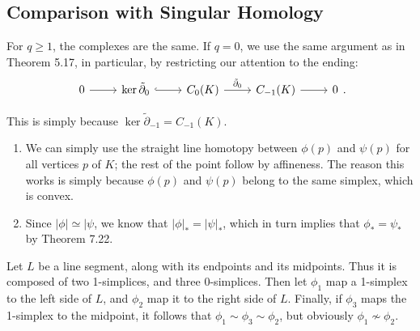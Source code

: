 \documentclass[../../solutions.tex]{subfiles}
\begin{document}
\subsection{Comparison with Singular Homology}
\begin{exercise} \leavevmode
For $q\ge1$, the complexes are the same.
If $q=0$, we use the same argument as in Theorem 5.17, in particular, by restricting our attention to the ending:
\[
\begin{tikzcd}
0\ar[r] & \ker\tilde\partial_0\ar[r,hookrightarrow] & C_0(K)\ar[r,"\tilde\partial_0"] & C_{-1}(K)\ar[r] & 0
\end{tikzcd}.
\]
\end{exercise}

\begin{exercise} \leavevmode
This is simply because $\ker\tilde\partial_{-1}=C_{-1}(K)$.
\end{exercise}

\begin{exercise} \leavevmode
\begin{enumerate}
\item
We can simply use the straight line homotopy between $\phi(p)$ and $\psi(p)$ for all vertices $p$ of $K$;
the rest of the point follow by affineness.
The reason this works is simply because $\phi(p)$ and $\psi(p)$ belong to the same simplex, which is convex.
\item
Since $|\phi|\simeq|\psi$, we know that $|\phi|_*=|\psi|_*$, which in turn implies that $\phi_*=\psi_*$ by Theorem 7.22.
\end{enumerate}
\end{exercise}

\begin{exercise} \leavevmode
Let $L$ be a line segment, along with its endpoints and its midpoints.
Thus it is composed of two 1-simplices, and three 0-simplices.
Then let $\phi_1$ map a 1-simplex to the left side of $L$, and $\phi_2$ map it to the right side of $L$.
Finally, if $\phi_3$ maps the 1-simplex to the midpoint, it follows that $\phi_1\sim\phi_3\sim\phi_2$, but obviously $\phi_1\not\sim\phi_2$.
\end{exercise}
\end{document}
